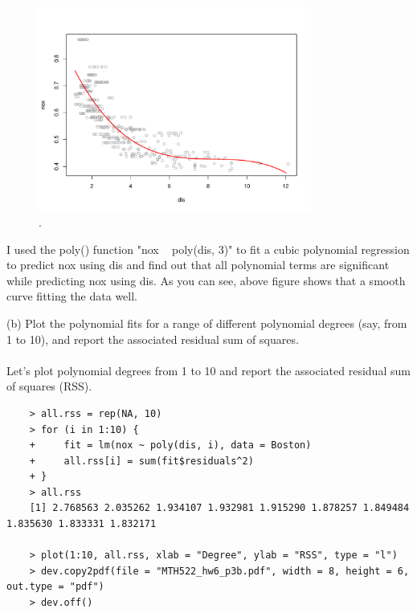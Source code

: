 \documentclass{article}
\begin{document}
\newpage


\begin{figure}[htb]
	\begin{center}
		\includegraphics[width=0.8\textwidth]{MTH522_hw6_p3a_1.pdf}
	\end{center}
	\caption{.}
	\label{fig:MTH522_hw6_p3a_1}
\end{figure}

I used the poly() function "nox ~ poly(dis, 3)"  to fit a cubic polynomial regression to predict nox using dis and find out that all polynomial terms are significant while predicting nox using dis. As you can see, above  figure shows that a smooth curve fitting the data well.\\


\newpage 

(b) Plot the polynomial fits for a range of different polynomial degrees (say, from 1 to 10), and report the associated residual sum of squares.\\
\\
Let's plot  polynomial degrees from 1 to 10 and report the associated residual sum of squares (RSS).


\begin{program}
	\begin{verbatim}
	> all.rss = rep(NA, 10)
	> for (i in 1:10) {
	+     fit = lm(nox ~ poly(dis, i), data = Boston)
	+     all.rss[i] = sum(fit$residuals^2)
	+ }
	> all.rss
	[1] 2.768563 2.035262 1.934107 1.932981 1.915290 1.878257 1.849484 1.835630 1.833331 1.832171
	
	> plot(1:10, all.rss, xlab = "Degree", ylab = "RSS", type = "l")
	> dev.copy2pdf(file = "MTH522_hw6_p3b.pdf", width = 8, height = 6, out.type = "pdf")
	> dev.off()
	\end{verbatim}
\end{program}
\end{document}
